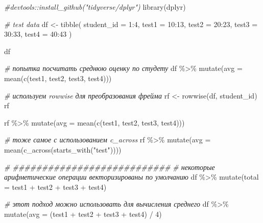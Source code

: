 \documentclass[
]{book}
\newenvironment{Shaded}{\begin{snugshade}}{\end{snugshade}}
\newcommand{\AttributeTok}[1]{\textcolor[rgb]{0.77,0.63,0.00}{#1}}
\newcommand{\CommentTok}[1]{\textcolor[rgb]{0.56,0.35,0.01}{\textit{#1}}}
\newcommand{\DecValTok}[1]{\textcolor[rgb]{0.00,0.00,0.81}{#1}}
\newcommand{\FunctionTok}[1]{\textcolor[rgb]{0.00,0.00,0.00}{#1}}
\newcommand{\NormalTok}[1]{#1}
\newcommand{\OtherTok}[1]{\textcolor[rgb]{0.56,0.35,0.01}{#1}}
\newcommand{\SpecialCharTok}[1]{\textcolor[rgb]{0.00,0.00,0.00}{#1}}
\newcommand{\StringTok}[1]{\textcolor[rgb]{0.31,0.60,0.02}{#1}}
\begin{document}
\begin{Shaded}
\begin{Highlighting}[]
\CommentTok{\#devtools::install\_github("tidyverse/dplyr")}
\FunctionTok{library}\NormalTok{(dplyr)}

\CommentTok{\# test data}
\NormalTok{df }\OtherTok{\textless{}{-}} \FunctionTok{tibble}\NormalTok{(}
  \AttributeTok{student\_id =} \DecValTok{1}\SpecialCharTok{:}\DecValTok{4}\NormalTok{, }
  \AttributeTok{test1 =} \DecValTok{10}\SpecialCharTok{:}\DecValTok{13}\NormalTok{, }
  \AttributeTok{test2 =} \DecValTok{20}\SpecialCharTok{:}\DecValTok{23}\NormalTok{, }
  \AttributeTok{test3 =} \DecValTok{30}\SpecialCharTok{:}\DecValTok{33}\NormalTok{, }
  \AttributeTok{test4 =} \DecValTok{40}\SpecialCharTok{:}\DecValTok{43}
\NormalTok{)}

\NormalTok{df}

\CommentTok{\# попытка посчитать среднюю оценку по студету}
\NormalTok{df }\SpecialCharTok{\%\textgreater{}\%} \FunctionTok{mutate}\NormalTok{(}\AttributeTok{avg =} \FunctionTok{mean}\NormalTok{(}\FunctionTok{c}\NormalTok{(test1, test2, test3, test4)))}

\CommentTok{\# используем rowwise для преобразования фрейма}
\NormalTok{rf }\OtherTok{\textless{}{-}} \FunctionTok{rowwise}\NormalTok{(df, student\_id)}
\NormalTok{rf}

\NormalTok{rf }\SpecialCharTok{\%\textgreater{}\%} \FunctionTok{mutate}\NormalTok{(}\AttributeTok{avg =} \FunctionTok{mean}\NormalTok{(}\FunctionTok{c}\NormalTok{(test1, test2, test3, test4)))}

\CommentTok{\# тоже самое с использованием c\_across}
\NormalTok{rf }\SpecialCharTok{\%\textgreater{}\%} \FunctionTok{mutate}\NormalTok{(}\AttributeTok{avg =} \FunctionTok{mean}\NormalTok{(}\FunctionTok{c\_across}\NormalTok{(}\FunctionTok{starts\_with}\NormalTok{(}\StringTok{"test"}\NormalTok{))))}

\CommentTok{\# \#\#\#\#\#\#\#\#\#\#\#\#\#\#\#\#\#\#\#\#\#\#\#\#\#\#\#}
\CommentTok{\# некоторые арифметические операции векторизированы по умолчанию}
\NormalTok{df }\SpecialCharTok{\%\textgreater{}\%} \FunctionTok{mutate}\NormalTok{(}\AttributeTok{total =}\NormalTok{ test1 }\SpecialCharTok{+}\NormalTok{ test2 }\SpecialCharTok{+}\NormalTok{ test3 }\SpecialCharTok{+}\NormalTok{ test4)}

\CommentTok{\# этот подход можно использовать для вычисления среднего}
\NormalTok{df }\SpecialCharTok{\%\textgreater{}\%} \FunctionTok{mutate}\NormalTok{(}\AttributeTok{avg =}\NormalTok{ (test1 }\SpecialCharTok{+}\NormalTok{ test2 }\SpecialCharTok{+}\NormalTok{ test3 }\SpecialCharTok{+}\NormalTok{ test4) }\SpecialCharTok{/} \DecValTok{4}\NormalTok{)}


\end{Highlighting}
\end{Shaded}
\end{document}
